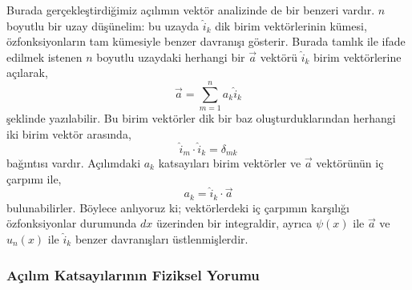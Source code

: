 \documentclass[a4paper,12pt, twoside]{article}
\begin{document}
Burada gerçekleştirdiğimiz açılımın vektör analizinde de bir benzeri vardır. $n$ boyutlu bir uzay düşünelim: bu uzayda $\hat i_k$ dik birim vektörlerinin kümesi, özfonksiyonların tam kümesiyle benzer davranışı gösterir. Burada tamlık ile ifade edilmek istenen $n$ boyutlu uzaydaki herhangi bir $\vec a$ vektörü $\hat i_k$ birim vektörlerine açılarak,
\begin{equation}
\vec a = \sum _ { m = 1 } ^ { n } a _ { k } \hat i _ { k }
\end{equation}
şeklinde yazılabilir. Bu birim vektörler dik bir baz oluşturduklarından herhangi iki birim vektör arasında,
\begin{equation}
\hat i  _ { m } \cdot \hat { i } _ { k } = \delta _ { m k }
\end{equation}
bağıntısı vardır. Açılımdaki $a_k$ katsayıları birim vektörler ve $\vec a$ vektörünün iç çarpımı ile,
\begin{equation}
a _ { k } = \hat i _ { k } \cdot \vec a
\end{equation}
bulunabilirler. Böylece anlıyoruz ki; vektörlerdeki iç çarpımın karşılığı özfonksiyonlar durumunda $dx$ üzerinden bir integraldir, ayrıca  $\psi(x)$ ile $\vec a$ ve $u_n(x)$ ile $\hat i_k$ benzer davranışları üstlenmişlerdir.

\subsubsection{Açılım Katsayılarının Fiziksel Yorumu}
\end{document}
